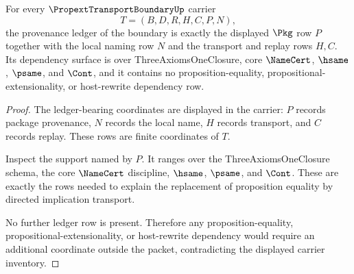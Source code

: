 \begin{theorem}
\label{thm:propext-transport-boundary-ledger-exactness}
For every $\PropextTransportBoundaryUp$ carrier
$$
T=(B,D,R,H,C,P,N),
$$
the provenance ledger of the boundary is exactly the displayed $\Pkg$ row $P$ together with the local naming row $N$ and the transport and replay rows $H,C$. Its dependency surface is over ThreeAxiomsOneClosure, core $\NameCert$, $\hsame$, $\psame$, and $\Cont$, and it contains no proposition-equality, propositional-extensionality, or host-rewrite dependency row.
\end{theorem}
\begin{proof}
The ledger-bearing coordinates are displayed in the carrier: $P$ records package provenance, $N$ records the local name, $H$ records transport, and $C$ records replay. These rows are finite coordinates of $T$.

Inspect the support named by $P$. It ranges over the ThreeAxiomsOneClosure schema, the core $\NameCert$ discipline, $\hsame$, $\psame$, and $\Cont$. These are exactly the rows needed to explain the replacement of proposition equality by directed implication transport.

No further ledger row is present. Therefore any proposition-equality, propositional-extensionality, or host-rewrite dependency would require an additional coordinate outside the packet, contradicting the displayed carrier inventory.
\end{proof}

